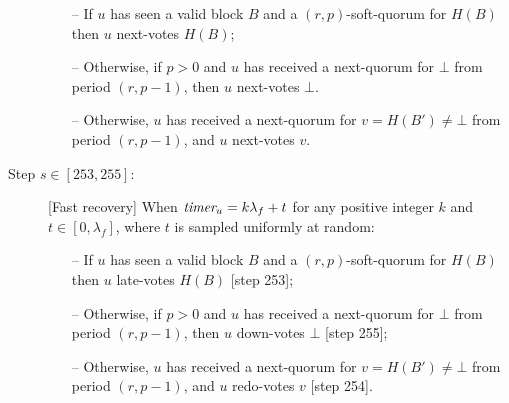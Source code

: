 \documentclass[../main.tex]{subfiles}
\begin{document}
\begin{description}
\begin{itemize}

\item[--] If $u$ has seen a valid block $B$ and a $(r,p)$-soft-quorum for $H(B)$ then $u$ next-votes $H(B)$;

\item[--] Otherwise, if $p>0$ and $u$ has received a next-quorum for $\bot$ from period $(r,p-1)$, then $u$ next-votes $\bot$.

\item[--] Otherwise, $u$ has received a next-quorum for $v=H(B') \neq \bot$ from period $(r,p-1)$, and $u$ next-votes $v$.

\end{itemize}


\item[{\sc Step $s \in [253,255]$:}] [Fast recovery] When $\textit{timer}_u = k\lambda_f + t$ for any positive integer $k$ and $t \in [0,\lambda_f]$, where $t$ is sampled uniformly at random:

\begin{itemize}

\item[--] If $u$ has seen a valid block $B$ and a $(r,p)$-soft-quorum for $H(B)$ then $u$ late-votes $H(B)$ [step 253];

\item[--] Otherwise, if $p>0$ and $u$ has received a next-quorum for $\bot$ from period $(r,p-1)$, then $u$ down-votes $\bot$ [step 255];

\item[--] Otherwise, $u$ has received a next-quorum for $v=H(B') \neq \bot$ from period $(r,p-1)$, and $u$ redo-votes $v$ [step 254].

\end{itemize}
\end{description}
\end{document}
